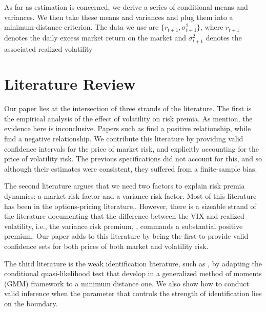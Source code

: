 \documentclass[11pt, letterpaper, twoside]{article}
\begin{document}
As far as estimation is concerned, we derive a series of conditional means and variances. We then take these means and variances and plug them into a minimum-distance  criterion. The data we use are $\lbrace r_{t+1}, \sigma^2_{t+1} \rbrace$, where $r_{t+1}$ denotes the daily excess market return on the market and $\sigma^2_{t+1}$ denotes the associated realized volatility 

\section{Literature Review}\label{sec:lit_review}

Our paper lies at the intersection of three strands of the literature. The first is the empirical analysis of the effect of volatility on risk premia. As \textcite[620]{lettau2010measuring} mention,  the evidence here is inconclusive. Papers such as \textcites{bollerslev1988capital, harvey1989timevarying, ghysels2005there, bali2006there, ludvigson2007empirical} find a positive relationship, while \textcites{campbell1987stock, breen1989economic, pagan1991nonparametric, whitelaw1994time, brandt2004relationship} find a negative relationship. We contribute this literature by providing valid confidence intervals for the price of market risk, and explicitly accounting for the price of volatility risk. The previous specifications did not account for this, and so although their estimates were consistent, they suffered from a finite-sample bias. 

The second literature argues that we need two factors to explain risk premia dynamics: a market risk factor and a variance risk factor. Most of this literature has been in the options-pricing literature,\parencites{christoffersen2013capturing, feunou2014risk, dewbecker2017price}. However, there is a sizeable strand of the literature documenting that the difference between the VIX and realized volatility, i.e., the variance risk premium, \parencites{bollerslev2008risk, drechsler2011whats}, commands a substantial positive premium. Our paper adds to this literature by being the first to provide valid confidence sets for both prices of both market and volatility risk.

The third literature is the weak identification literature, such as \textcites{andrews2016conditional, andrews2012estimation}, by adapting the conditional quasi-likelihood test that \textcite{andrews2016conditional} develop in a generalized method of moments (GMM) framework to a minimum distance one. We also show how to conduct valid inference when the parameter that controls the strength of identification lies on the boundary.
\end{document}
